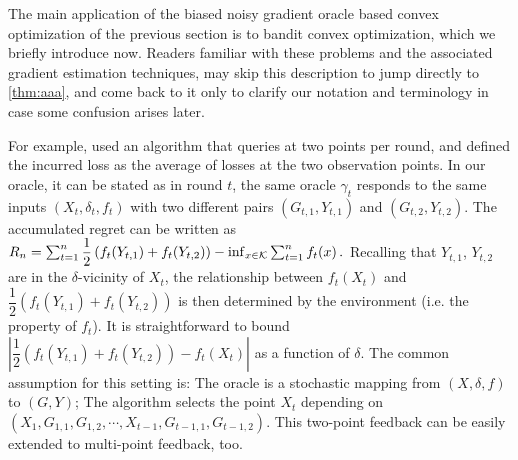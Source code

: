 The main application of the biased noisy gradient oracle based convex optimization of the previous section
is to bandit convex optimization, which we briefly introduce now. Readers familiar with these problems and the associated
gradient estimation techniques, may skip this description to jump directly to \cref{thm:aaa},
and come back to it only to clarify our notation and terminology in case some confusion arises later.

For example, \cite{AgDeXi10} used an algorithm that queries at two points per round, and defined the incurred loss as the average of losses at the two observation points. In our oracle, it can be stated as in round $t$, the same oracle $\gamma_t$ responds to the same inputs $(X_t, \delta_t, f_t)$ with two different pairs $(G_{t,1}, Y_{t,1})$ and $(G_{t,2}, Y_{t,2})$. The accumulated regret can be written as
$%
R_n = \sum_{t=1}^n \dfrac{1}{2}\left( f_t(Y_{t,1})+f_t(Y_{t,2}) \right) -\inf_{x \in \cK}\sum_{t=1}^n f_t(x) \,.
$ %
Recalling that $Y_{t,1}$, $Y_{t,2}$ are in the $\delta$-vicinity of $X_t$, the relationship between $f_t(X_t)$ and $\dfrac{1}{2}\left( f_t(Y_{t,1})+f_t(Y_{t,2})\right)$ is then determined by the environment (i.e. the property of $f_t$). It is straightforward to bound $| \dfrac{1}{2}\left( f_t(Y_{t,1})+f_t(Y_{t,2})\right)- f_t(X_t)|$ as a function of $\delta$. 
The common assumption for this setting is: The oracle is a stochastic mapping from $(X, \delta, f)$ to $(G, Y)$; The algorithm selects the point $X_t$ depending on $\left( X_1, G_{1,1}, G_{1,2}, \cdots, X_{t-1},G_{t-1,1}, G_{t-1,2}  \right)$. This two-point feedback can be easily extended to multi-point feedback, too.
\fi

